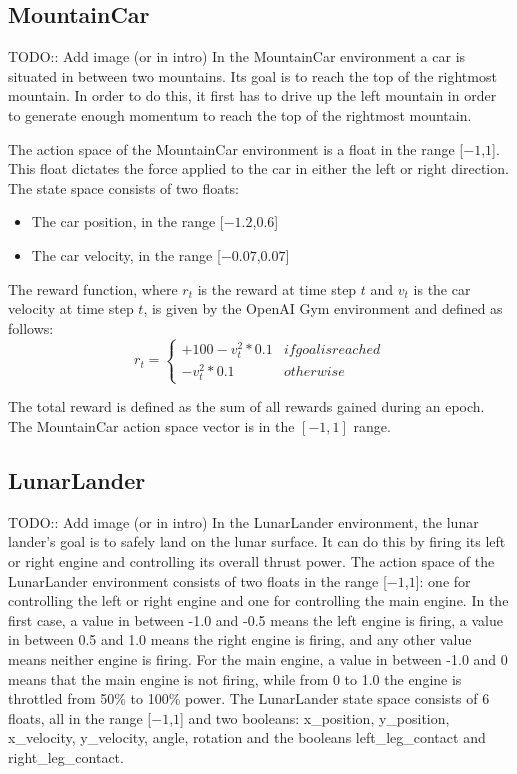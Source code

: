 \subsection{MountainCar}
TODO:: Add image (or in intro)
In the MountainCar environment a car is situated in between two mountains. Its goal is to reach the top of the rightmost mountain. In order to do this, it first has to drive up the left mountain in order to generate enough momentum to reach the top of the rightmost mountain. 

The action space of the MountainCar environment is a float in the range [$-1$,$1$]. This float dictates the force applied to the car in either the left or right direction. The state space consists of two floats:
\begin{itemize}
    \item[] The car position, in the range [$-1.2$,$0.6$]
    \item[] The car velocity, in the range [$-0.07$,$0.07$]
\end{itemize}

The reward function, where $r_t$ is the reward at time step $t$ and $v_t$ is the car velocity at time step $t$, is given by the OpenAI Gym environment and defined as follows:
\begin{equation}
    r_t =
    \begin{cases*}
      +100 -v_t^2 * 0.1 & if goal is reached \\
      -v_t^2 * 0.1 & otherwise
    \end{cases*}
\end{equation}

The total reward is defined as the sum of all rewards gained during an epoch. The MountainCar action space vector is in the $[-1,1]$ range. 

\subsection{LunarLander}
TODO:: Add image (or in intro)
In the LunarLander environment, the lunar lander's goal is to safely land on the lunar surface. It can do this by firing its left or right engine and controlling its overall thrust power. The action space of the LunarLander environment consists of two floats in the range [$-1$,$1$]: one for controlling the left or right engine and one for controlling the main engine. In the first case, a value in between -1.0 and -0.5 means the left engine is firing, a value in between 0.5 and 1.0 means the right engine is firing, and any other value means neither engine is firing. For the main engine, a value in between -1.0 and 0 means that the main engine is not firing, while from 0 to 1.0 the engine is throttled from 50\% to 100\% power. The LunarLander state space consists of 6 floats, all in the range [$-1$,$1$] and two booleans: x\_position, y\_position, x\_velocity, y\_velocity, angle, rotation and the booleans left\_leg\_contact and right\_leg\_contact.  

